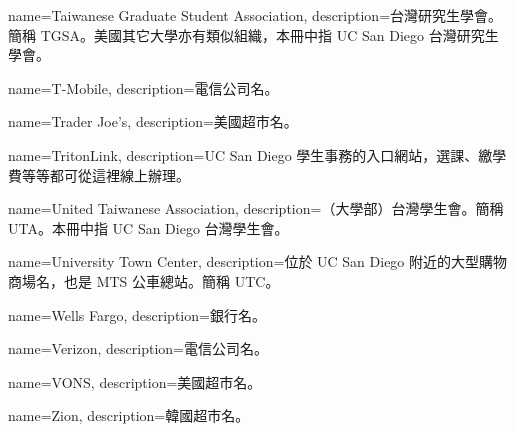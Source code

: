 {
  name={Taiwanese Graduate Student Association},
  description={台灣研究生學會。簡稱 TGSA。美國其它大學亦有類似組織，本冊中指 UC San Diego 台灣研究生學會。}
}

{
  name={T-Mobile},
  description={電信公司名。}
}

{
  name={Trader Joe's},
  description={美國超市名。}
}

{
  name={TritonLink},
  description={UC San Diego 學生事務的入口網站，選課、繳學費等等都可從這裡線上辦理。}
}

{
  name={United Taiwanese Association},
  description={（大學部）台灣學生會。簡稱 UTA。本冊中指 UC San Diego 台灣學生會。}
}

{
  name={University Town Center},
  description={位於 UC San Diego 附近的大型購物商場名，也是 MTS 公車總站。簡稱 UTC。}
}

{
  name={Wells Fargo},
  description={銀行名。}
}

{
  name={Verizon},
  description={電信公司名。}
}

{
  name={VONS},
  description={美國超市名。}
}

{
  name={Zion},
  description={韓國超市名。}
}
